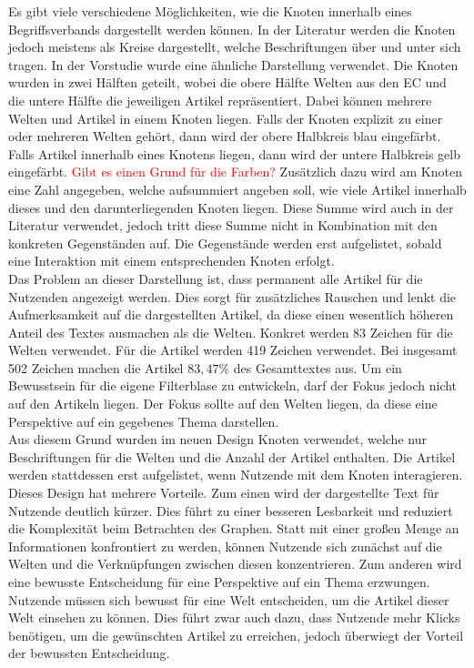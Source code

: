 Es gibt viele verschiedene Möglichkeiten, wie die Knoten innerhalb eines Begriffsverbands dargestellt werden können.
In der Literatur werden die Knoten jedoch meistens als Kreise dargestellt, welche Beschriftungen über und unter sich tragen.
In der Vorstudie wurde eine ähnliche Darstellung verwendet.
Die Knoten wurden in zwei Hälften geteilt, wobei die obere Hälfte Welten aus den \ac{EC} und die untere Hälfte die jeweiligen Artikel repräsentiert.
Dabei können mehrere Welten und Artikel in einem Knoten liegen.
Falls der Knoten explizit zu einer oder mehreren Welten gehört, dann wird der obere Halbkreis blau eingefärbt.
Falls Artikel innerhalb eines Knotens liegen, dann wird der untere Halbkreis gelb eingefärbt. \textcolor{red}{Gibt es einen Grund für die Farben?}
Zusätzlich dazu wird am Knoten eine Zahl angegeben, welche aufsummiert angeben soll, wie viele Artikel innerhalb dieses und den darunterliegenden Knoten liegen.
Diese Summe wird auch in der Literatur verwendet, jedoch tritt diese Summe nicht in Kombination mit den konkreten Gegenständen auf.
Die Gegenstände werden erst aufgelistet, sobald eine Interaktion mit einem entsprechenden Knoten erfolgt. \\

Das Problem an dieser Darstellung ist, dass permanent alle Artikel für die Nutzenden angezeigt werden.
Dies sorgt für zusätzliches Rauschen und lenkt die Aufmerksamkeit auf die dargestellten Artikel, da diese einen wesentlich höheren Anteil des Textes ausmachen als die Welten.
Konkret werden 83 Zeichen für die Welten verwendet.
Für die Artikel werden 419 Zeichen verwendet.
Bei insgesamt 502 Zeichen machen die Artikel $83,47\%$ des Gesamttextes aus.
Um ein Bewusstsein für die eigene Filterblase zu entwickeln, darf der Fokus jedoch nicht auf den Artikeln liegen.
Der Fokus sollte auf den Welten liegen, da diese eine Perspektive auf ein gegebenes Thema darstellen.\\

Aus diesem Grund wurden im neuen Design Knoten verwendet, welche nur Beschriftungen für die Welten und die Anzahl der Artikel enthalten.
Die Artikel werden stattdessen erst aufgelistet, wenn Nutzende mit dem Knoten interagieren.
Dieses Design hat mehrere Vorteile.
Zum einen wird der dargestellte Text für Nutzende deutlich kürzer.
Dies führt zu einer besseren Lesbarkeit und reduziert die Komplexität beim Betrachten des Graphen.
Statt mit einer großen Menge an Informationen konfrontiert zu werden, können Nutzende sich zunächst auf die Welten und die Verknüpfungen zwischen diesen konzentrieren.
Zum anderen wird eine bewusste Entscheidung für eine Perspektive auf ein Thema erzwungen.
Nutzende müssen sich bewusst für eine Welt entscheiden, um die Artikel dieser Welt einsehen zu können.
Dies führt zwar auch dazu, dass Nutzende mehr Klicks benötigen, um die gewünschten Artikel zu erreichen, jedoch überwiegt der Vorteil der bewussten Entscheidung.\\

